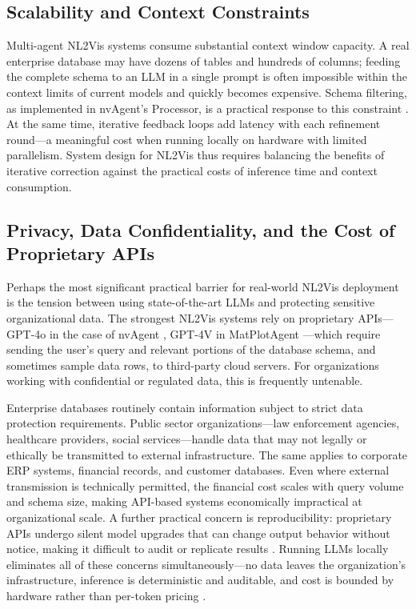 \documentclass[a4paper,oneside,bibliography=totoc]{scrbook}
\begin{document}
\subsection{Scalability and Context Constraints}

Multi-agent NL2Vis systems consume substantial context window capacity. A real enterprise database may have dozens of tables and hundreds of columns; feeding the complete schema to an LLM in a single prompt is often impossible within the context limits of current models and quickly becomes expensive. Schema filtering, as implemented in nvAgent's Processor, is a practical response to this constraint \cite{ouyang2025nvagent}. At the same time, iterative feedback loops add latency with each refinement round---a meaningful cost when running locally on hardware with limited parallelism. System design for NL2Vis thus requires balancing the benefits of iterative correction against the practical costs of inference time and context consumption.

\subsection{Privacy, Data Confidentiality, and the Cost of Proprietary APIs}
\label{sec:privacy}

Perhaps the most significant practical barrier for real-world NL2Vis deployment is the tension between using state-of-the-art LLMs and protecting sensitive organizational data. The strongest NL2Vis systems rely on proprietary APIs---GPT-4o in the case of nvAgent \cite{ouyang2025nvagent}, GPT-4V in MatPlotAgent \cite{yang2024matplotagent}---which require sending the user's query and relevant portions of the database schema, and sometimes sample data rows, to third-party cloud servers. For organizations working with confidential or regulated data, this is frequently untenable.

Enterprise databases routinely contain information subject to strict data protection requirements. Public sector organizations---law enforcement agencies, healthcare providers, social services---handle data that may not legally or ethically be transmitted to external infrastructure. The same applies to corporate ERP systems, financial records, and customer databases. Even where external transmission is technically permitted, the financial cost scales with query volume and schema size, making API-based systems economically impractical at organizational scale. A further practical concern is reproducibility: proprietary APIs undergo silent model upgrades that can change output behavior without notice, making it difficult to audit or replicate results \cite{maddigan2023chat2vis}. Running LLMs locally eliminates all of these concerns simultaneously---no data leaves the organization's infrastructure, inference is deterministic and auditable, and cost is bounded by hardware rather than per-token pricing \cite{lin2024awq}.
\end{document}
